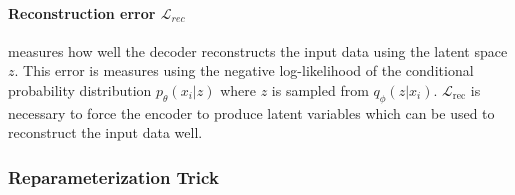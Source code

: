 

\paragraph{Reconstruction error $\mathcal{L}_{rec}$} measures how well the decoder reconstructs the input data using the latent space $z$.
This error is measures using the negative log-likelihood of the conditional probability distribution $p_\theta(x_i|z)$ where $z$ is sampled from $q_\phi(z | x_i)$.
$\mathcal{L}_{\mathrm{rec}}$ is necessary to force the encoder to produce latent variables which can be used to reconstruct the input data well.


%





\subsubsection{Reparameterization Trick}

